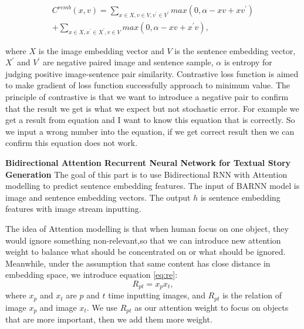 \documentclass[11pt]{article}
\begin{document}
\begin{small}
\begin{equation}
\begin{aligned}
C^{remb}(x,v) = \sum_{x \in X, v \in V, v^{'} \in V^{'}} max(0, \alpha -xv + xv^{'}) \\
				 + \sum_{x \in X, x^{'} \in X^{'}, v \in V} max(0, \alpha -xv + x^{'}v),
\end{aligned}
\label{eq:lfss}
\end{equation}
\end{small}
where $X$ is the image embedding vector and $V$ is the sentence embedding vector, $X^{'}$ and $ V^{'}$ are negative paired image and sentence sample, $\alpha$ is entropy for judging positive image-sentence pair similarity. Contrastive loss function \cite{1467314} is aimed to make gradient of loss function successfully approach to minimum value. The principle of contrastive is that we want to introduce a negative pair to confirm that the result we get is what we expect but not stochastic error. For example we get a result from equation and I want to know this equation that is correctly. So we input a wrong number into the equation, if we get correct result then we can confirm this equation does not work. 

{\bf Bidirectional Attention Recurrent Neural Network for Textual Story Generation} The goal of this part is to use Bidirectional RNN with Attention modelling to predict sentence embedding features. The input of BARNN model is image and sentence embedding vectors. The output $h$ is sentence embedding features with image stream inputting. 

The idea of Attention modelling \cite{730558} is that when human focus on one object, they would ignore something non-relevant,so that we can introduce new attention weight to balance what should be concentrated on or what should be ignored. Meanwhile, under the assumption that same content has close distance in embedding space, we introduce equation \ref{eq:re}:
\begin{equation}
R_{pt} = x_{p}x_{t},
\label{eq:re}
\end{equation}    
where $x_{p}$ and $x_{t}$ are $p$ and $t$ time inputting images, and $R_{pt}$ is the relation of image $x_{p}$ and image $x_{t}$. We use $R_{pt}$ as our attention weight to focus on objects that are more important, then we add them more weight.
\end{document}
